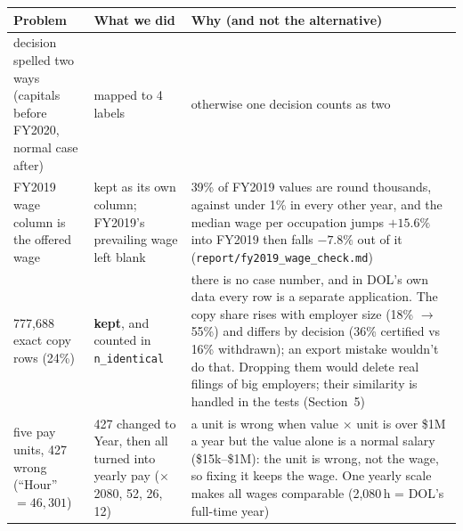 \documentclass[10pt,a4paper,twocolumn]{article}
\newcommand{\code}[1]{\texttt{#1}}
\begin{document}
{\footnotesize
\begin{tabularx}{\linewidth}{@{}L{1.95cm} L{2.35cm} Y@{}}
\toprule
\textbf{Problem} & \textbf{What we did} & \textbf{Why (and not the alternative)} \\
\midrule
decision spelled two ways (capitals before FY2020, normal case after)
 & mapped to 4 labels
 & otherwise one decision counts as two \\
FY2019 wage column is the offered wage
 & kept as its own column; FY2019's prevailing wage left blank
 & 39\% of FY2019 values are round thousands, against under 1\% in every other year, and the median wage per occupation jumps $+15.6\%$ into FY2019 then falls $-7.8\%$ out of it (\code{report/\allowbreak fy2019\_\allowbreak wage\_\allowbreak check.md}) \\
777{,}688 exact copy rows (24\%)
 & \textbf{kept}, and counted in \code{n\_identical}
 & there is no case number, and in DOL's own data every row is a separate application. The copy share rises with employer size (18\% $\to$ 55\%) and differs by decision (36\% certified vs 16\% withdrawn); an export mistake wouldn't do that. Dropping them would delete real filings of big employers; their similarity is handled in the tests (Section~5) \\
five pay units, 427 wrong (``Hour'' $=46{,}301$)
 & 427 changed to Year, then all turned into yearly pay ($\times$2080, 52, 26, 12)
 & a unit is wrong when value $\times$ unit is over \$1M a year but the value alone is a normal salary (\$15k--\$1M): the unit is wrong, not the wage, so fixing it keeps the wage. One yearly scale makes all wages comparable (2{,}080\,h = DOL's full-time year) \\
\bottomrule
\end{tabularx}}
\end{document}
